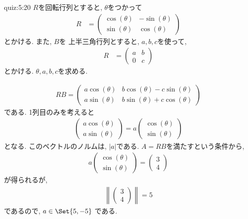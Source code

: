 \begin{answerof}{quiz:5:20}
  $R$を回転行列とすると,
  $\theta$をつかって
  \begin{align*}
    R&=\begin{pmatrix}\cos(\theta)&-\sin(\theta)\\\sin(\theta)&\cos(\theta)\end{pmatrix}
  \end{align*}
  とかける.
  また,
  $B$を
  上半三角行列とすると,
  $a,b,c$を使って,
  \begin{align*}
    R&=\begin{pmatrix}a&b\\0&c\end{pmatrix}
  \end{align*}
  とかける.
  $\theta,a,b,c$を求める.

  \begin{align*}
    RB=
    \begin{pmatrix}a\cos(\theta)&b\cos(\theta)-c\sin(\theta)\\
      a\sin(\theta)&b\sin(\theta)+c\cos(\theta)\end{pmatrix}
  \end{align*}
  である.
  1列目のみを考えると
  \begin{align*}
    \begin{pmatrix}a\cos(\theta)\\a\sin(\theta)\end{pmatrix}
    =a\begin{pmatrix}\cos(\theta)\\\sin(\theta)\end{pmatrix}
  \end{align*}
  となる.
  このベクトルのノルムは, $|a|$である.
  $A=RB$を満たすという条件から,
  \begin{align*}
    a\begin{pmatrix}\cos(\theta)\\\sin(\theta)\end{pmatrix}
    =\begin{pmatrix}3\\4\end{pmatrix}    
  \end{align*}
  が得られるが, 
 \begin{align*}
     \left\|\begin{pmatrix}3\\4\end{pmatrix}\right\|=5
  \end{align*}
 であるので, $a\in\Set{5,-5}$ である.


\end{answerof}
